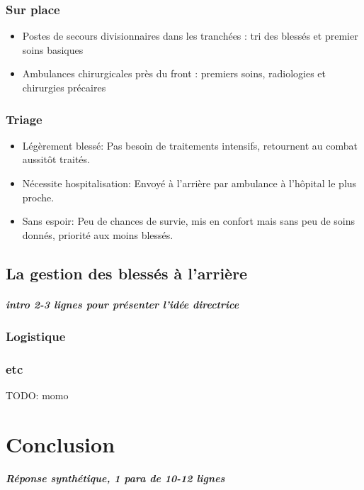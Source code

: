 \documentclass[a4paper, BCOR=0mm, fontsize=12pt, titlepage=firstiscover]{scrreprt}
\begin{document}
		\subsection{Sur place}
			\begin{itemize}
				\item Postes de secours divisionnaires dans les tranchées : tri des blessés et premier soins basiques
				\item Ambulances chirurgicales près du front : premiers soins, radiologies et chirurgies précaires
			\end{itemize}
		\subsection{Triage}
			\begin{itemize}
				\item Légèrement blessé: Pas besoin de traitements intensifs, retournent au combat aussitôt traités.
				\item Nécessite hospitalisation: Envoyé à l'arrière par ambulance à l'hôpital le plus proche.
				\item Sans espoir: Peu de chances de survie, mis en confort mais sans peu de soins donnés, priorité aux moins blessés. \cite{triage}
			\end{itemize}
	\newpage
	\section{La gestion des blessés à l'arrière}
		\paragraph{intro 2-3 lignes pour présenter l'idée directrice}
		\subsection{Logistique}
		\subsection{etc}
		TODO: momo
	\chapter{Conclusion}
		\paragraph{Réponse synthétique, 1 para de 10-12 lignes}
\end{document}
